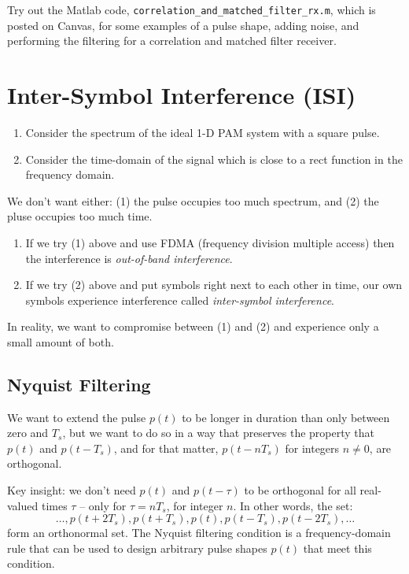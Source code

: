 Try out the Matlab code,
\texttt{correlation\_and\_matched\_filter\_rx.m}, which is posted on
Canvas, for some examples of a pulse shape, adding noise, and performing the filtering for a correlation and matched filter receiver.


\section{Inter-Symbol Interference (ISI)}


\begin{enumerate}
  \item Consider the spectrum of the ideal 1-D PAM system with a square pulse.
  \item Consider the time-domain of the signal which is close to a rect function in the frequency domain.
\end{enumerate}
We don't want either:  (1) the pulse occupies too much spectrum, and (2) the pluse occupies too much time.
\begin{enumerate}
  \item If we try (1) above and use FDMA (frequency division
  multiple access) then the interference is \emph{out-of-band
  interference}.
  \item If we try (2) above and put symbols right next to each other in time, our
  own symbols experience interference called \emph{inter-symbol
  interference}.
\end{enumerate}

In reality, we want to compromise between (1) and (2) and experience
only a small amount of both.




\subsection{Nyquist Filtering}

We want to extend the pulse $p(t)$ to be longer in duration than only between zero and $T_s$, but we want to do so in a way that preserves the property that $p(t)$ and $p(t-T_s)$, and for that matter, $p(t-nT_s)$ for integers $n\neq 0$, are orthogonal.

Key insight:  we don't need $p(t)$ and $p(t-\tau)$ to be orthogonal for all real-valued times $\tau$ -- only for $\tau = nT_{s}$, for integer $n$.  In other words, the set:
\[
 \ldots,p(t+2T_s), p(t+T_s), p(t), p(t-T_s), p(t-2T_s), \ldots
\]
form an orthonormal set.  The Nyquist filtering condition is a frequency-domain rule that can be used to design arbitrary pulse shapes $p(t)$ that meet this condition.



